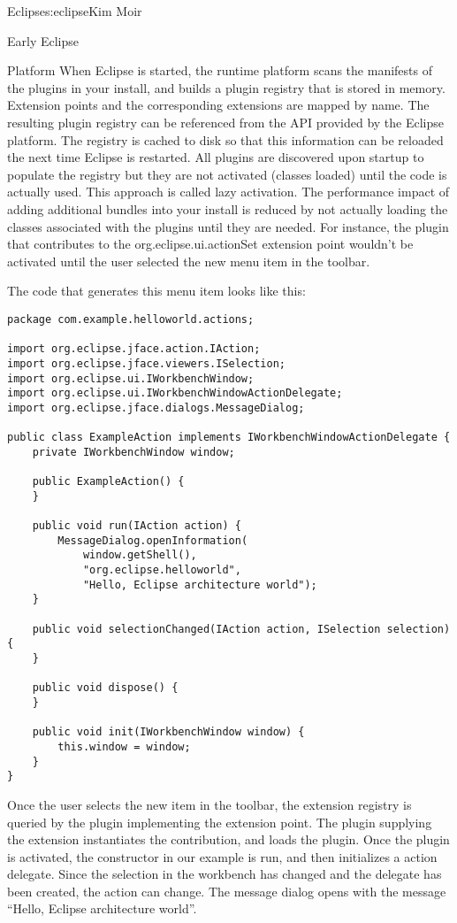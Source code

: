\begin{aosachapter}{Eclipse}{s:eclipse}{Kim Moir}
\begin{aosasect1}{Early Eclipse}
\begin{aosasect2}{Platform}
When Eclipse is started, the runtime platform scans the manifests of
the plugins in your install, and builds a plugin registry that is
stored in memory.  Extension points and the corresponding extensions
are mapped by name. The resulting plugin registry can be referenced
from the API provided by the Eclipse platform.  The registry is cached to
disk so that this information can be reloaded the next time Eclipse is
restarted. All plugins are discovered upon startup to populate the
registry but they are not activated (classes loaded) until the code is
actually used. This approach is called lazy activation. The
performance impact of adding additional bundles into your install is
reduced by not actually loading the classes associated with the
plugins until they are needed. For instance, the plugin that
contributes to the org.eclipse.ui.actionSet extension point wouldn't
be activated until the user selected the new menu item in the toolbar.


The code that generates this menu item looks like this:

\begin{verbatim}
package com.example.helloworld.actions;

import org.eclipse.jface.action.IAction;
import org.eclipse.jface.viewers.ISelection;
import org.eclipse.ui.IWorkbenchWindow;
import org.eclipse.ui.IWorkbenchWindowActionDelegate;
import org.eclipse.jface.dialogs.MessageDialog;

public class ExampleAction implements IWorkbenchWindowActionDelegate {
    private IWorkbenchWindow window;

    public ExampleAction() {
    }

    public void run(IAction action) {
        MessageDialog.openInformation(
            window.getShell(),
            "org.eclipse.helloworld",
            "Hello, Eclipse architecture world");
    }

    public void selectionChanged(IAction action, ISelection selection) {
    }

    public void dispose() {
    }

    public void init(IWorkbenchWindow window) {
        this.window = window;
    }
}
\end{verbatim}

Once the user selects the new item in the toolbar, the extension
registry is queried by the plugin implementing the extension point.
The plugin supplying the extension instantiates the contribution, and
loads the plugin. Once the plugin is activated, the 
constructor in our example is run, and then initializes a 
action delegate. Since the selection in the workbench has changed and
the delegate has been created, the action can change. The message
dialog opens with the message ``Hello, Eclipse architecture world''.


\end{aosasect2}
\end{aosasect1}
\end{aosachapter}
